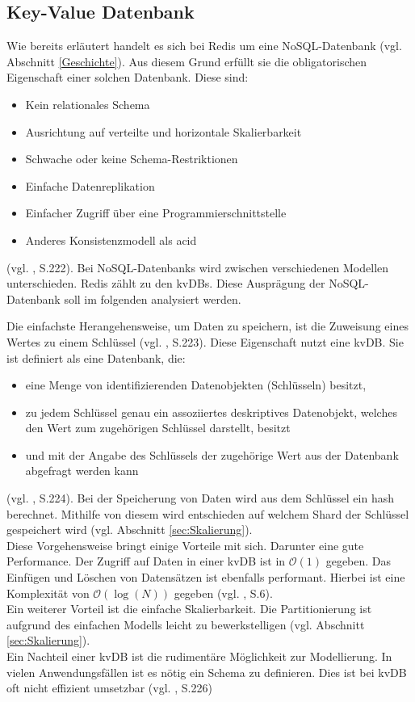 
\subsection{Key-Value Datenbank}
Wie bereits erläutert handelt es sich bei \acs{Redis} um eine \acs{NoSQL-Datenbank} (vgl. Abschnitt \ref{Geschichte}). Aus diesem Grund erfüllt sie die obligatorischen Eigenschaft einer solchen Datenbank. Diese sind: 
\begin{itemize}
	\item Kein relationales Schema
	\item Ausrichtung auf verteilte und horizontale Skalierbarkeit 
	\item Schwache oder keine Schema-Restriktionen 
	\item Einfache Datenreplikation 
	\item Einfacher Zugriff über eine Programmierschnittstelle
	\item Anderes Konsistenzmodell als \gls{acid}
\end{itemize}
(vgl. \cite{1}, S.222). Bei \acp{NoSQL-Datenbank} wird zwischen verschiedenen Modellen unterschieden. \acs{Redis} zählt zu den \glspl{kvDB}. Diese Ausprägung der \acs{NoSQL-Datenbank} soll im folgenden analysiert werden. 

Die einfachste Herangehensweise, um Daten zu speichern, ist die Zuweisung eines Wertes zu einem Schlüssel (vgl. \cite{1}, S.223). Diese Eigenschaft nutzt eine \gls{kvDB}. Sie ist definiert als eine Datenbank, die:
\begin{itemize}
	\item  eine Menge von identifizierenden Datenobjekten (Schlüsseln) besitzt,
	\item  zu jedem Schlüssel genau ein assoziiertes deskriptives Datenobjekt, welches den Wert zum zugehörigen Schlüssel darstellt, besitzt
	\item und mit der Angabe des Schlüssels der zugehörige Wert aus der Datenbank abgefragt werden kann
\end{itemize}
(vgl. \cite{1}, S.224). Bei der Speicherung von Daten wird aus dem Schlüssel ein \gls{hash} berechnet. Mithilfe von diesem wird entschieden auf welchem Shard der Schlüssel gespeichert wird (vgl. Abschnitt \ref{sec:Skalierung}).
\\Diese Vorgehensweise bringt einige Vorteile mit sich. Darunter eine gute Performance. Der Zugriff auf Daten in einer \gls{kvDB} ist in $\mathcal{O}(1)$ gegeben. Das Einfügen und Löschen von Datensätzen ist ebenfalls performant. Hierbei ist eine Komplexität von $\mathcal{O}(\log{(N)})$ gegeben (vgl. \cite{keyValueComp}, S.6). 
\\Ein weiterer Vorteil ist die einfache Skalierbarkeit. Die Partitionierung ist aufgrund des einfachen Modells leicht zu bewerkstelligen (vgl. Abschnitt \ref{sec:Skalierung}).
\\Ein Nachteil einer \gls{kvDB} ist die rudimentäre Möglichkeit zur Modellierung. In vielen Anwendungsfällen ist es nötig ein Schema zu definieren. Dies ist bei \gls{kvDB} oft nicht effizient umsetzbar (vgl. \cite{1}, S.226)